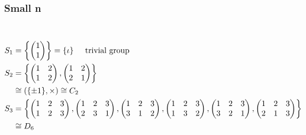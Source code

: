 \hypertarget{small-n}{%
\subsubsection{Small n}\label{small-n}}

\begin{example} ~\vspace*{-1.5\baselineskip}
\begin{align*}
  S_1 &= \left\{ \begin{pmatrix}1 \\1\end{pmatrix} \right\} = \{ \iota \} \hspace{.5cm} \text{trivial group} \\
  S_2 &= \left\{ \begin{pmatrix}
  1 & 2 \\
  1 & 2
  \end{pmatrix}, \begin{pmatrix}
  1 & 2 \\
  2 & 1
  \end{pmatrix} \right\} \\
  &\cong \left( \{ \pm 1 \}, \times \right) \cong C_2 \\
  S_3 &= \left\{ \begin{pmatrix}
  1 & 2 & 3 \\
  1 & 2 & 3
  \end{pmatrix}, 
  \begin{pmatrix}
  1 & 2 & 3 \\
  2 & 3 & 1
  \end{pmatrix}, 
  \begin{pmatrix}
      1 & 2 & 3 \\
      3 & 1 & 2
  \end{pmatrix}, 
  \begin{pmatrix}
      1 & 2 & 3 \\
      1 & 3 & 2
  \end{pmatrix}, 
  \begin{pmatrix}
      1 & 2 & 3 \\
      3 & 2 & 1
  \end{pmatrix}, 
  \begin{pmatrix}
      1 & 2 & 3 \\
      2 & 1 & 3
  \end{pmatrix} \right\} \\
  & \cong D_6
\end{align*}
\end{example} 

